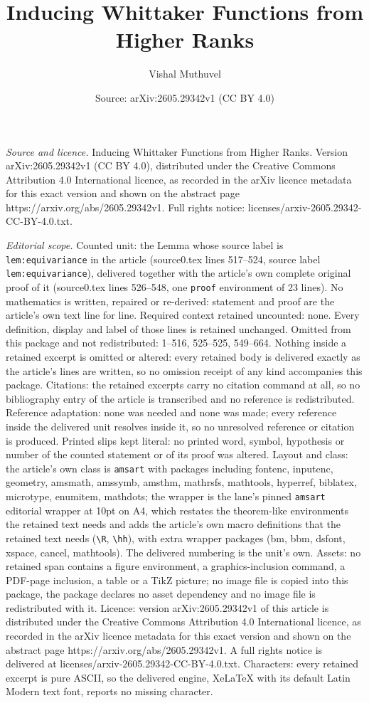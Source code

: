 \documentclass[10pt,a4paper]{amsart}
\title[Inducing Whittaker Functions from Higher Ranks]{Inducing Whittaker Functions from Higher Ranks}
\author{Vishal Muthuvel}
\date{Source: arXiv:2605.29342v1 (CC BY 4.0)}
\begin{document}
\maketitle

\noindent\emph{Source and licence.} Inducing Whittaker Functions from Higher Ranks. Version arXiv:2605.29342v1 (CC BY 4.0), distributed under the Creative Commons Attribution 4.0 International licence, as recorded in the arXiv licence metadata for this exact version and shown on the abstract page https://arxiv.org/abs/2605.29342v1. Full rights notice: licenses/arxiv-2605.29342-CC-BY-4.0.txt.\par\smallskip

\noindent\textit{Editorial scope.} Counted unit: the Lemma whose source label is \texttt{lem:equivariance} in the article (source0.tex lines 517--524, source label \texttt{lem:equivariance}), delivered together with the article's own complete original proof of it (source0.tex lines 526--548, one \texttt{proof} environment of 23 lines). No mathematics is written, repaired or re-derived: statement and proof are the article's own text line for line. Required context retained uncounted: none. Every definition, display and label of those lines is retained unchanged. Omitted from this package and not redistributed: 1--516, 525--525, 549--664. Nothing inside a retained excerpt is omitted or altered: every retained body is delivered exactly as the article's lines are written, so no omission receipt of any kind accompanies this package. Citations: the retained excerpts carry no citation command at all, so no bibliography entry of the article is transcribed and no reference is redistributed. Reference adaptation: none was needed and none was made; every reference inside the delivered unit resolves inside it, so no unresolved reference or citation is produced. Printed slips kept literal: no printed word, symbol, hypothesis or number of the counted statement or of its proof was altered. Layout and class: the article's own class is \texttt{amsart} with packages including fontenc, inputenc, geometry, amsmath, amssymb, amsthm, mathrsfs, mathtools, hyperref, biblatex, microtype, enumitem, mathdots; the wrapper is the lane's pinned \texttt{amsart} editorial wrapper at 10pt on A4, which restates the theorem-like environments the retained text needs and adds the article's own macro definitions that the retained text needs (\texttt{\textbackslash R}, \texttt{\textbackslash hh}), with extra wrapper packages (bm, bbm, dsfont, xspace, cancel, mathtools). The delivered numbering is the unit's own. Assets: no retained span contains a figure environment, a graphics-inclusion command, a PDF-page inclusion, a table or a TikZ picture; no image file is copied into this package, the package declares no asset dependency and no image file is redistributed with it. Licence: version arXiv:2605.29342v1 of this article is distributed under the Creative Commons Attribution 4.0 International licence, as recorded in the arXiv licence metadata for this exact version and shown on the abstract page https://arxiv.org/abs/2605.29342v1. A full rights notice is delivered at licenses/arxiv-2605.29342-CC-BY-4.0.txt. Characters: every retained excerpt is pure ASCII, so the delivered engine, XeLaTeX with its default Latin Modern text font, reports no missing character.
\end{document}
